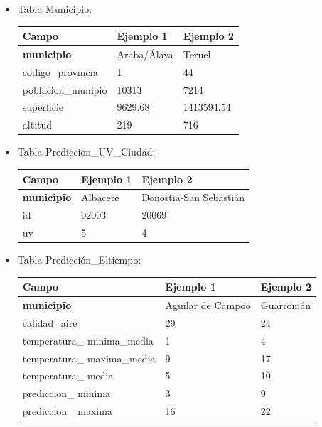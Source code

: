 \documentclass[12pt, a4paper]{article}
\begin{document}
\begin{itemize}

\item Tabla Municipio:

\begin{center}
\begin{tabular}{|p{}|p{}|p{}|}
    \hline
    \textbf{Campo} & \textbf{Ejemplo 1} & \textbf{Ejemplo 2} \\
    \hline
    \textbf{municipio} & Araba/Álava & Teruel \\
    codigo\_provincia & 1 & 44 \\
    poblacion\_munipio & 10313 & 7214 \\
    superficie & 9629.68 & 1413594.54 \\
    altitud & 219 & 716 \\
    \hline
\end{tabular}
\end{center}

\newpage
\item Tabla Prediccion\_UV\_Ciudad:

\begin{center}
\begin{tabular}{|p{}|p{}|p{}|}
    \hline
    \textbf{Campo} & \textbf{Ejemplo 1} & \textbf{Ejemplo 2} \\
    \hline
    \textbf{municipio} & Albacete & Donostia-San Sebastián \\
    id & 02003 & 20069 \\
    uv & 5 & 4 \\
    \hline
\end{tabular}
\end{center}


\item Tabla Predicción\_Eltiempo:

\begin{center}
\begin{tabular}{|p{}|p{}|p{}|}
    \hline
    \textbf{Campo} & \textbf{Ejemplo 1} & \textbf{Ejemplo 2} \\
    \hline
    \textbf{municipio} & Aguilar de Campoo & Guarromán \\
    calidad\_aire & 29 & 24 \\
    temperatura\_ minima\_media & 1 & 4 \\
    temperatura\_ maxima\_media & 9 & 17 \\
    temperatura\_ media & 5 & 10 \\
    prediccion\_ minima & 3 & 9 \\
    prediccion\_ maxima & 16 & 22 \\
    \hline
\end{tabular}
\end{center}



\end{itemize}
\end{document}
